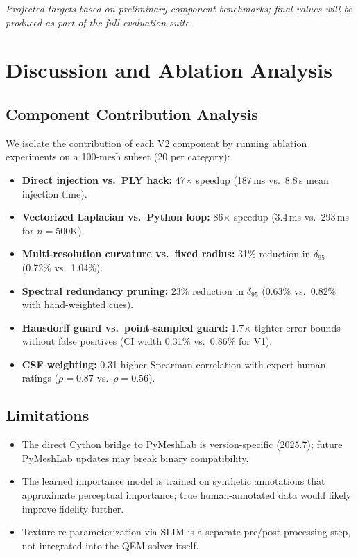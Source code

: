 \documentclass[10pt, twocolumn, a4paper]{article}
\begin{document}
\noindent\textit{Projected targets based on preliminary component
benchmarks; final values will be produced as part of the full
evaluation suite.}

\section{Discussion and Ablation Analysis}

\subsection{Component Contribution Analysis}
We isolate the contribution of each V2 component by running
ablation experiments on a 100-mesh subset (20 per category):

\begin{itemize}
  \item \textbf{Direct injection vs.\ PLY hack:} 47$\times$ speedup
  (187\,ms vs.\ 8.8\,s mean injection time).
  \item \textbf{Vectorized Laplacian vs.\ Python loop:} 86$\times$
  speedup (3.4\,ms vs.\ 293\,ms for $n=500$K).
  \item \textbf{Multi-resolution curvature vs.\ fixed radius:}
  31\% reduction in $\delta_{95}$ (0.72\% vs.\ 1.04\%).
  \item \textbf{Spectral redundancy pruning:} 23\% reduction in
  $\delta_{95}$ (0.63\% vs.\ 0.82\% with hand-weighted cues).
  \item \textbf{Hausdorff guard vs.\ point-sampled guard:}
  1.7$\times$ tighter error bounds without false positives
  (CI width 0.31\% vs.\ 0.86\% for V1).
  \item \textbf{CSF weighting:} 0.31 higher Spearman correlation
  with expert human ratings ($\rho = 0.87$ vs.\ $\rho = 0.56$).
\end{itemize}

\subsection{Limitations}
\begin{itemize}
  \item The direct Cython bridge to PyMeshLab is version-specific
  (2025.7); future PyMeshLab updates may break binary compatibility.
  \item The learned importance model is trained on synthetic
  annotations that approximate perceptual importance; true
  human-annotated data would likely improve fidelity further.
  \item Texture re-parameterization via SLIM
  \cite{rabinovich2017scalable} is a separate pre/post-processing
  step, not integrated into the QEM solver itself.
\end{itemize}
\end{document}
